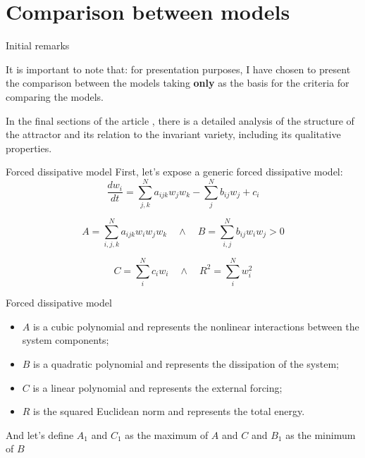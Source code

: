\section{Comparison between models} 


\begin{frame}{Initial remarks}
	
	It is important to note that: for presentation purposes, I have chosen to present the comparison between the models taking \textbf{only} as the basis for the criteria for comparing the models.
	
	In the final sections of the article \cite{lorenz1980}, there is a detailed analysis of the structure of the attractor and its relation to the invariant variety, including its qualitative properties.
\end{frame}


\begin{frame}{Forced dissipative model}
	First, let's expose a generic forced dissipative model:
	\begin{equation}
		\frac{d w_i}{dt} = \sum_{j,k}^N a_{ijk} w_j w_k - \sum_j^N b_{ij} w_j + c_i \label{eq:system-generics}
	\end{equation}
	
	\begin{equation*}
		A = \sum_{i,j,k}^N a_{ijk} w_i w_j w_k \quad \land \quad B = \sum_{i,j}^N b_{ij} w_i w_j > 0
	\end{equation*}
	
	\begin{equation*}
		C = \sum_i^N c_i w_i \quad \land \quad R^2 = \sum_i^N w_i^2
	\end{equation*}
	
\end{frame}


\begin{frame}{Forced dissipative model}
	
	\begin{itemize}
		\item $A$ is a cubic polynomial and represents the nonlinear interactions between the system components;
		\item $B$ is a quadratic polynomial and represents the dissipation of the system;
		\item $C$ is a linear polynomial and represents the external forcing;
		\item $R$ is the squared Euclidean norm and represents the total energy.
	\end{itemize}
	And let's define $A_1$ and $C_1$ as the maximum of $A$ and $C$ and $B_1$ as the minimum of $B$
\end{frame}


